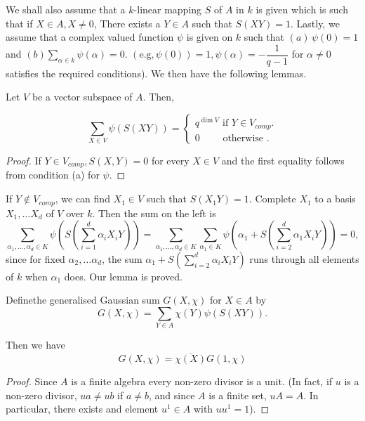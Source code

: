 We shall also assume that a $k$-linear mapping $S$ of $A$ in $k$ is
given which is such that if $X \in A, X\neq 0$, There exists a $Y \in
A$ such that $S(XY)=1$. Lastly, we assume that a complex valued
function $\psi$ is given on $k$ such that $(a)\, \psi (0)=1$ and
$(b)\sum\limits_{\alpha \in k} \psi (\alpha)=0$. $(\text{e.g,}\, \psi
(0))=1,\psi (\alpha)=-\dfrac{1}{q-1}$ for $\alpha \neq 0$ satisfies
the required conditions). We then have the following lemmas. 

\setcounter{Lemma}{0}
\begin{Lemma}\label{chap17:sec31:lem1}%
  Let $V$ be a vector subspace of $A$. Then,
\end{Lemma}
$$
\sum_{X \in V}\psi (S(XY))= 
\begin{cases}
  q^{\dim V} \text{ if }Y \in V_{comp}.\\ 
  0 \qquad \text{ otherwise }.
\end{cases}
$$

\begin{proof}
  If $Y \in V_{comp},S(X, Y)=0$ for every $X \in V$ and the first
  equality follows from condition (a) for $\psi$. 
\end{proof}

If $Y \notin V_{comp}$, we can find $X_1 \in V$ such that
$S(X_1Y)=1$. Complete $X_1$ to a basis $X_1, \ldots X_d$ of $V$ over
$k$. Then the sum on the left is 
$$ 
\sum_{\alpha_1 ,\ldots,\alpha_d \in K} \psi \left(S\left(\sum^d_{i=1}\alpha_i
X_i Y\right)\right) =\sum_{\alpha_1 ,\ldots,\alpha_d \in
  K}\sum_{\alpha_1 \in K}\psi
\left(\alpha_1+S \left(\sum^d_{i=2} \alpha_1 X_i Y\right)\right)=0, 
$$
since for fixed $\alpha_2,\ldots \alpha_d$, the sum
$\alpha_1+S(\sum^d_{i=2}\alpha_i X_i Y)$ runs through all elements of
$k$ when $\alpha_1$ does. Our lemma is proved. 

\begin{Lemma}\label{chap17:sec31:lem2}%
  Define\pageoriginale the generalised Gaussian sum $G(X, \chi)$ for $X \in A$ by
  $$
  G(X,\chi)=\sum_{Y\in A}\chi (Y)\psi (S(XY)).
  $$
  
  Then we have
  $$
  G(X,\chi)=\overline{\chi (X)} G(1,\chi)
  $$
\end{Lemma}

\begin{proof}
  Since $A$ is a finite algebra every non-zero divisor is a unit. (In
  fact, if $u$ is a non-zero divisor, $ua \neq ub$ if $a \neq b$, and
  since $A$ is a finite set, $uA=A$. In particular, there exists and
  element $u^1 \in A$ with $uu^1=1$). 
\end{proof}

